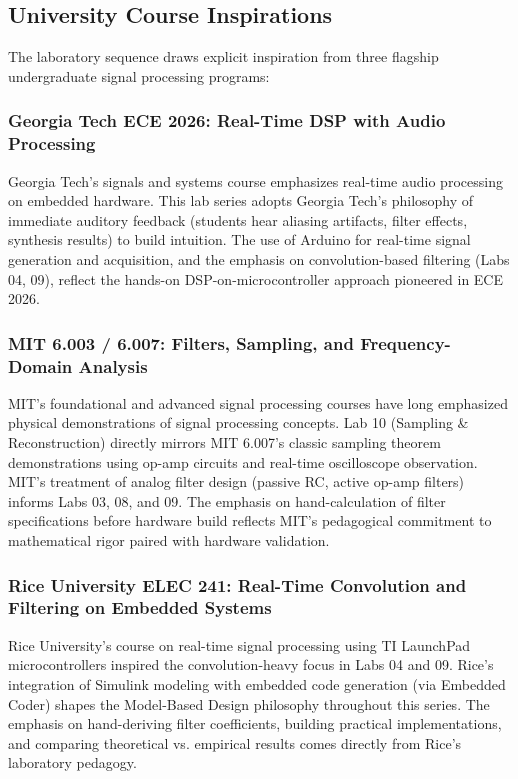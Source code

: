 \documentclass[11pt,letterpaper]{article}
\begin{document}
\subsection*{University Course Inspirations}

The laboratory sequence draws explicit inspiration from three flagship undergraduate signal processing programs:

\subsubsection*{Georgia Tech ECE 2026: Real-Time DSP with Audio Processing}

Georgia Tech's signals and systems course emphasizes real-time audio processing on embedded hardware. This lab series adopts Georgia Tech's philosophy of immediate auditory feedback (students hear aliasing artifacts, filter effects, synthesis results) to build intuition. The use of Arduino for real-time signal generation and acquisition, and the emphasis on convolution-based filtering (Labs 04, 09), reflect the hands-on DSP-on-microcontroller approach pioneered in ECE 2026.

\subsubsection*{MIT 6.003 / 6.007: Filters, Sampling, and Frequency-Domain Analysis}

MIT's foundational and advanced signal processing courses have long emphasized physical demonstrations of signal processing concepts. Lab 10 (Sampling & Reconstruction) directly mirrors MIT 6.007's classic sampling theorem demonstrations using op-amp circuits and real-time oscilloscope observation. MIT's treatment of analog filter design (passive RC, active op-amp filters) informs Labs 03, 08, and 09. The emphasis on hand-calculation of filter specifications before hardware build reflects MIT's pedagogical commitment to mathematical rigor paired with hardware validation.

\subsubsection*{Rice University ELEC 241: Real-Time Convolution and Filtering on Embedded Systems}

Rice University's course on real-time signal processing using TI LaunchPad microcontrollers inspired the convolution-heavy focus in Labs 04 and 09. Rice's integration of Simulink modeling with embedded code generation (via Embedded Coder) shapes the Model-Based Design philosophy throughout this series. The emphasis on hand-deriving filter coefficients, building practical implementations, and comparing theoretical vs. empirical results comes directly from Rice's laboratory pedagogy.
\end{document}
